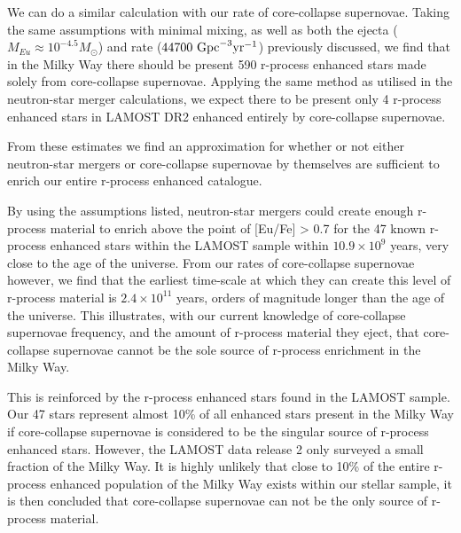 \documentclass[a4paper,fleqn,usenatbib]{mnras}
\begin{document}
    
    We can do a similar calculation with our rate of core-collapse supernovae. Taking the same assumptions with minimal mixing, as well as both the ejecta ($M_{Eu}\approx10^{-4.5} M_{\odot}$) and rate ($44700\ \rm{Gpc}^{-3} \rm{yr^{-1}}$) previously discussed, we find that in the Milky Way there should be present 590 r-process enhanced stars made solely from core-collapse supernovae. Applying the same method as utilised in the neutron-star merger calculations, we expect there to be present only 4 r-process enhanced stars in LAMOST DR2 enhanced entirely by core-collapse supernovae.
    
    
    From these estimates we find an approximation for whether or not either neutron-star mergers or core-collapse supernovae by themselves are sufficient to enrich our entire r-process enhanced catalogue. 
    
    By using the assumptions listed, neutron-star mergers could create enough r-process material to enrich above the point of [Eu/Fe] > 0.7 for the 47 known r-process enhanced stars within the LAMOST sample within $10.9\times10^{9}$ years, very close to the age of the universe. From our rates of core-collapse supernovae however, we find that the earliest time-scale at which they can create this level of r-process material is $2.4\times10^{11}$ years, orders of magnitude longer than the age of the universe. This illustrates, with our current knowledge of core-collapse supernovae frequency, and the amount of r-process material they eject, that core-collapse supernovae cannot be the sole source of r-process enrichment in the Milky Way.
    
    This is reinforced by the r-process enhanced stars found in the LAMOST sample. Our 47 stars represent almost 10\% of all enhanced stars present in the Milky Way if core-collapse supernovae is considered to be the singular source of r-process enhanced stars. However, the LAMOST data release 2 only surveyed a small fraction of the Milky Way. It is highly unlikely that close to 10\% of the entire r-process enhanced population of the Milky Way exists within our stellar sample, it is then concluded that core-collapse supernovae can not be the only source of r-process material. 
    
\end{document}
